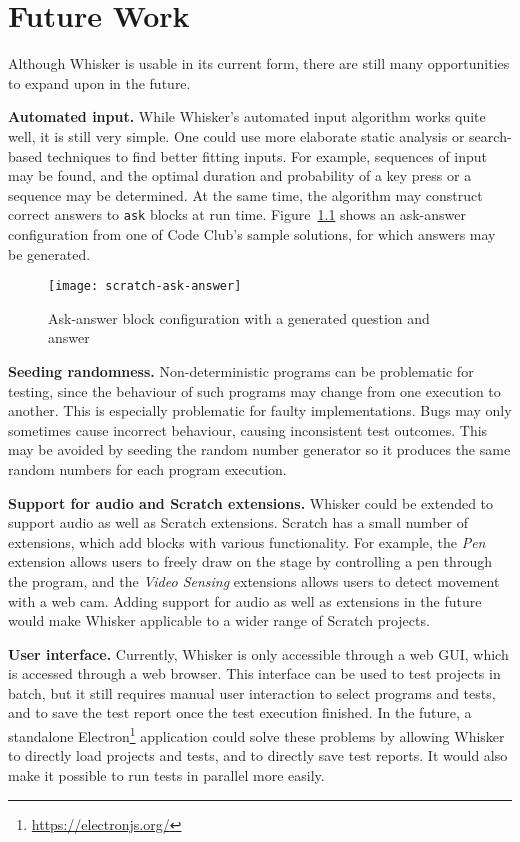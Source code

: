 \chapter{Future Work}
\label{cha:future_work}

Although Whisker is usable in its current form,
there are still many opportunities to expand upon in the future.
\parspace

\textbf{Automated input.}
While Whisker's automated input algorithm works quite well, it is still very simple.
One could use more elaborate static analysis or search-based techniques to find better fitting inputs.
For example, sequences of input may be found, and the optimal duration and probability of a key press or a sequence may be determined.
At the same time, the algorithm may construct correct answers to \texttt{ask} blocks at run time.
Figure~\ref{fig:generated_ask_answer} shows an ask-answer configuration from one of Code Club's sample solutions,
for which answers may be generated.

\begin{figure}[htpb]
    \centering
    \texttt{[image: scratch-ask-answer]}
    \caption{Ask-answer block configuration with a generated question and answer}
    \label{fig:generated_ask_answer}
\end{figure}

\textbf{Seeding randomness.}
Non-deterministic programs can be problematic for testing,
since the behaviour of such programs may change from one execution to another.
This is especially problematic for faulty implementations.
Bugs may only sometimes cause incorrect behaviour, causing inconsistent test outcomes.
This may be avoided by seeding the random number generator so it produces the same random numbers for each program execution.
\parspace

\textbf{Support for audio and Scratch extensions.}
Whisker could be extended to support audio as well as Scratch extensions.
Scratch has a small number of extensions, which add blocks with various functionality.
For example, the \textit{Pen} extension allows users to freely draw on the stage by controlling a pen through the program,
and the \textit{Video Sensing} extensions allows users to detect movement with a web cam.
Adding support for audio as well as extensions in the future would make Whisker applicable to a wider range of Scratch projects.
\parspace

\textbf{User interface.}
Currently, Whisker is only accessible through a web GUI, which is accessed through a web browser.
This interface can be used to test projects in batch, but it still requires manual user interaction to select programs and tests,
and to save the test report once the test execution finished.
In the future, a standalone Electron\footnote{\url{https://electronjs.org/}} application could solve these problems by allowing Whisker to directly load projects and tests,
and to directly save test reports.
It would also make it possible to run tests in parallel more easily.
\parspace

